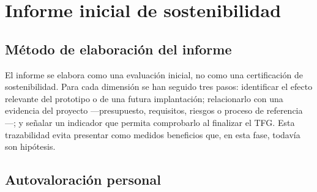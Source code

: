 
\chapter{Informe inicial de sostenibilidad}\label{sec:5}

\section{Método de elaboración del informe}\label{sec:5-1}

El informe se elabora como una evaluación inicial, no como una certificación de sostenibilidad. Para cada dimensión se han seguido tres pasos: identificar el efecto relevante del prototipo o de una futura implantación; relacionarlo con una evidencia del proyecto —presupuesto, requisitos, riesgos o proceso de referencia—; y señalar un indicador que permita comprobarlo al finalizar el TFG. Esta trazabilidad evita presentar como medidos beneficios que, en esta fase, todavía son hipótesis.

\section{Autovaloración personal}\label{sec:5-2}

